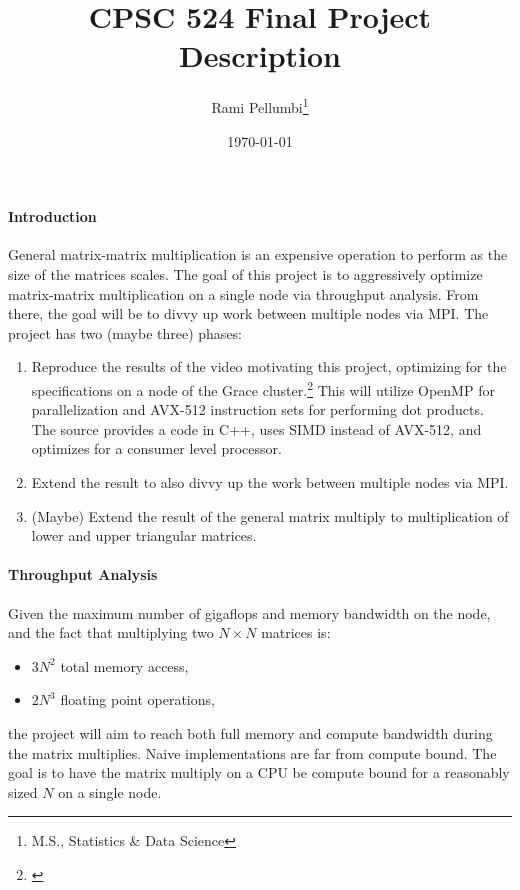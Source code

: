 \documentclass{article}
\title{CPSC 524 Final Project Description}
\author{Rami Pellumbi\thanks{M.S., Statistics \& Data Science}}
\date{\today}
\newcommand{\MYhref}[3][blue]{\href{#2}{\color{#1}{#3}}}%
\begin{document}
\maketitle

\newpage 
\paragraph*{Introduction}
General matrix-matrix multiplication is an expensive operation to perform as 
the size of the matrices scales. The goal of this project is to aggressively 
optimize matrix-matrix multiplication on a single node via throughput analysis. 
From there, the goal will be to divvy up work between multiple nodes via MPI. 
The project has two (maybe three) phases:
\begin{enumerate}
    \item Reproduce the results of the video motivating this project, optimizing for the specifications on a node of the Grace cluster.\footnote{
        \MYhref{https://www.youtube.com/watch?v=QGYvbsHDPxo\&t=0s\&ab\_channel\=DepthBuffer}{YouTube Source}
    }
    This will utilize OpenMP for parallelization and AVX-512 instruction sets for performing dot products. The 
    source provides a code in C++, uses SIMD instead of AVX-512, and optimizes for a consumer level processor.
    \item Extend the result to also divvy up the work between multiple nodes via MPI.
    \item (Maybe) Extend the result of the general matrix multiply to multiplication of lower and upper triangular matrices.
\end{enumerate}

\paragraph*{Throughput Analysis}
Given the maximum number of gigaflops and memory bandwidth on the node, and the 
fact that multiplying two $N \times N$ matrices is:
\begin{itemize}
    \item $3N^2$ total memory access,
    \item $2N^3$ floating point operations,
\end{itemize}
the project will aim to reach both full memory and compute bandwidth during 
the matrix multiplies. Naive implementations are far from compute bound.
The goal is to have the matrix multiply on a CPU be compute bound 
for a reasonably sized $N$ on a single node.
\end{document}
